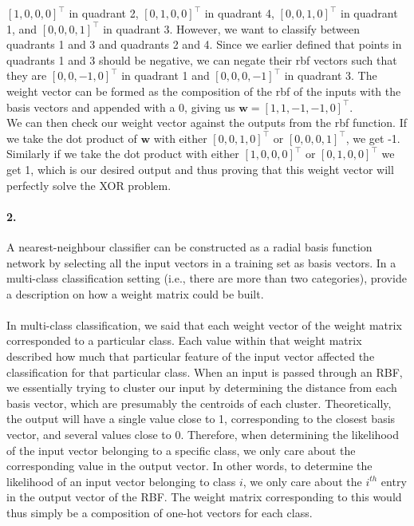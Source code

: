 \documentclass{article}
\newcommand{\vect}[1]{\mathbf{#1}}
\newcommand{\vw}[0]{\vect{w}}
\begin{document}
$[1, 0, 0, 0]^\top$ in quadrant 2, $[0, 1, 0, 0]^\top$ in quadrant 4, $[0, 0, 1, 0]^\top$ in quadrant 1, and $[0, 0, 0, 1]^\top$ in quadrant 3. However, we want to classify between quadrants 1 and 3 and quadrants 2 and 4. Since we earlier defined that points in quadrants 1 and 3 should be negative, we can negate their rbf vectors such that they are $[0, 0, -1, 0]^\top$ in quadrant 1 and $[0, 0, 0, -1]^\top$ in quadrant 3. The weight vector can be formed as the composition of the rbf of the inputs with the basis vectors and appended with a 0, giving us $\vw = \left[ 1, 1, -1, -1, 0 \right]^\top$. \\
We can then check our weight vector against the outputs from the rbf function. If we take the dot product of $\vw$ with either $[0, 0, 1, 0]^\top$ or $[0, 0, 0, 1]^\top$, we get -1. Similarly if we take the dot product with either $[1, 0, 0, 0]^\top$ or $[0, 1, 0, 0]^\top$ we get 1, which is our desired output and thus proving that this weight vector will perfectly solve the XOR problem.


\vspace{30mm}

\paragraph{2.}

A nearest-neighbour classifier can be constructed as a radial basis
function network by selecting all the input vectors in a training set as basis
vectors. In a multi-class classification setting (i.e., there are more than two
categories), provide a description on how a weight matrix could be built. \\
\\
In multi-class classification, we said that each weight vector of the weight matrix corresponded to a particular class. Each value within that weight matrix described how much that particular feature of the input vector affected the classification for that particular class. When an input is passed through an RBF, we essentially trying to cluster our input by determining the distance from each basis vector, which are presumably the centroids of each cluster. Theoretically, the output will have a single value close to 1, corresponding to the closest basis vector, and several values close to 0. Therefore, when determining the likelihood of the input vector belonging to a specific class, we only care about the corresponding value in the output vector. In other words, to determine the likelihood of an input vector belonging to class $i$, we only care about the $i^{th}$ entry in the output vector of the RBF. The weight matrix corresponding to this would thus simply be a composition of one-hot vectors for each class.
\vspace{30mm}
\end{document}
